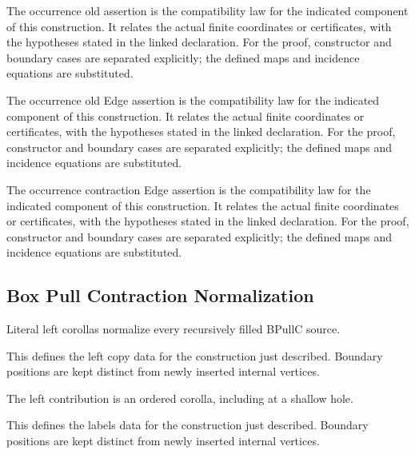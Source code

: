 The occurrence old assertion is the compatibility law for the indicated component of this construction. It relates the actual finite coordinates or certificates, with the hypotheses stated in the linked declaration.
For the proof, constructor and boundary cases are separated explicitly; the defined maps and incidence equations are substituted.
\par{}

The occurrence old Edge assertion is the compatibility law for the indicated component of this construction. It relates the actual finite coordinates or certificates, with the hypotheses stated in the linked declaration.
For the proof, constructor and boundary cases are separated explicitly; the defined maps and incidence equations are substituted.
\par{}

The occurrence contraction Edge assertion is the compatibility law for the indicated component of this construction. It relates the actual finite coordinates or certificates, with the hypotheses stated in the linked declaration.
For the proof, constructor and boundary cases are separated explicitly; the defined maps and incidence equations are substituted.
\par{}

\subsection{Box Pull Contraction Normalization}
Literal left corollas normalize every recursively filled BPullC source.

This defines the left copy data for the construction just described. Boundary positions are kept distinct from newly inserted internal vertices.
\par{}

The left contribution is an ordered corolla, including at a shallow hole.
\par{}

This defines the labels data for the construction just described. Boundary positions are kept distinct from newly inserted internal vertices.
\par{}

